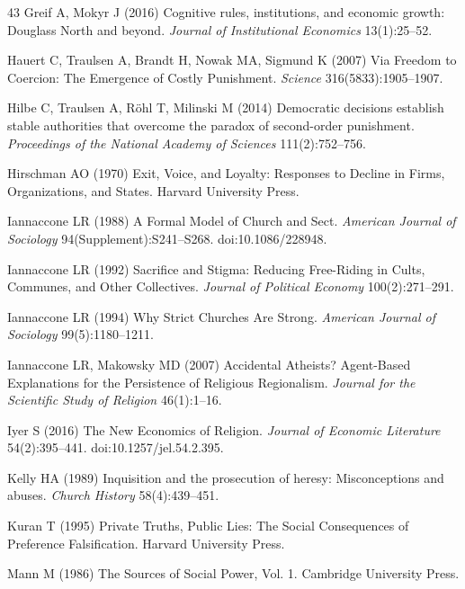 \documentclass[12pt]{article}
\begin{document}
\begin{thebibliography}{43}
Greif A, Mokyr J (2016) Cognitive rules, institutions, and economic growth: Douglass North and beyond. \textit{Journal of Institutional Economics} 13(1):25--52.

Hauert C, Traulsen A, Brandt H, Nowak MA, Sigmund K (2007) Via Freedom to Coercion: The Emergence of Costly Punishment. \textit{Science} 316(5833):1905--1907.

Hilbe C, Traulsen A, R\"ohl T, Milinski M (2014) Democratic decisions establish stable authorities that overcome the paradox of second-order punishment. \textit{Proceedings of the National Academy of Sciences} 111(2):752--756.

Hirschman AO (1970) Exit, Voice, and Loyalty: Responses to Decline in Firms, Organizations, and States. Harvard University Press.

Iannaccone LR (1988) A Formal Model of Church and Sect. \textit{American Journal of Sociology} 94(Supplement):S241--S268. doi:10.1086/228948.

Iannaccone LR (1992) Sacrifice and Stigma: Reducing Free-Riding in Cults, Communes, and Other Collectives. \textit{Journal of Political Economy} 100(2):271--291.

Iannaccone LR (1994) Why Strict Churches Are Strong. \textit{American Journal of Sociology} 99(5):1180--1211.

Iannaccone LR, Makowsky MD (2007) Accidental Atheists? Agent-Based Explanations for the Persistence of Religious Regionalism. \textit{Journal for the Scientific Study of Religion} 46(1):1--16.

Iyer S (2016) The New Economics of Religion. \textit{Journal of Economic Literature} 54(2):395--441. doi:10.1257/jel.54.2.395.

Kelly HA (1989) Inquisition and the prosecution of heresy: Misconceptions and abuses. \textit{Church History} 58(4):439--451.

Kuran T (1995) Private Truths, Public Lies: The Social Consequences of Preference Falsification. Harvard University Press.

Mann M (1986) The Sources of Social Power, Vol. 1. Cambridge University Press.


\end{thebibliography}
\end{document}
